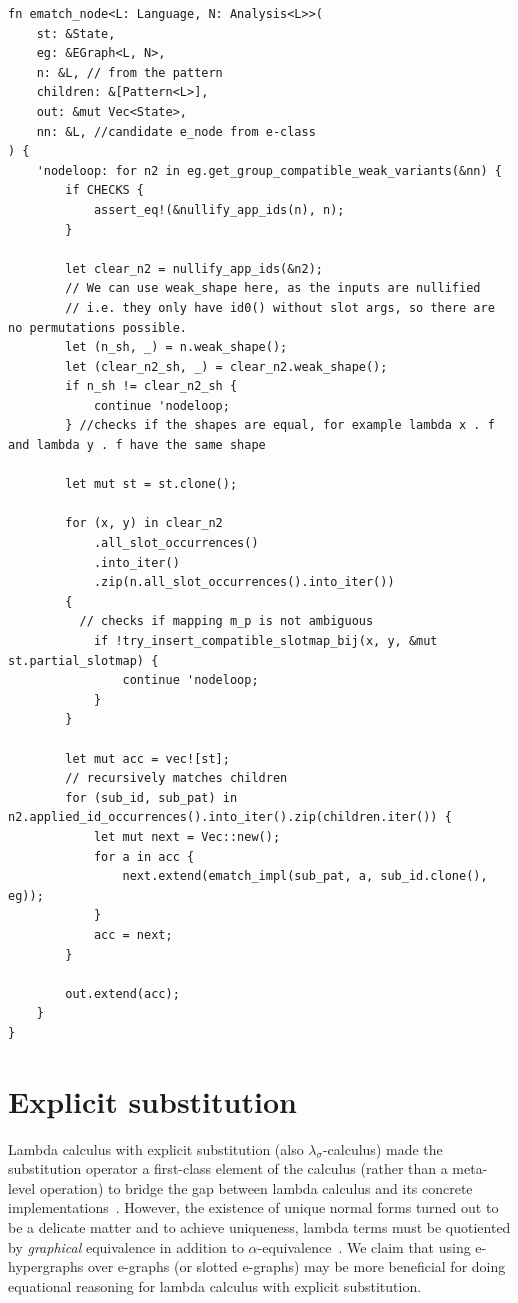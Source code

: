 \documentclass[acmsmall,screen, nonacm, anonymous]{acmart}
\begin{document}
\begin{listing}
\begin{verbatim}
fn ematch_node<L: Language, N: Analysis<L>>(
    st: &State,
    eg: &EGraph<L, N>,
    n: &L, // from the pattern
    children: &[Pattern<L>],
    out: &mut Vec<State>,
    nn: &L, //candidate e_node from e-class
) {
    'nodeloop: for n2 in eg.get_group_compatible_weak_variants(&nn) {
        if CHECKS {
            assert_eq!(&nullify_app_ids(n), n);
        }

        let clear_n2 = nullify_app_ids(&n2);
        // We can use weak_shape here, as the inputs are nullified
        // i.e. they only have id0() without slot args, so there are no permutations possible.
        let (n_sh, _) = n.weak_shape();
        let (clear_n2_sh, _) = clear_n2.weak_shape();
        if n_sh != clear_n2_sh {
            continue 'nodeloop;
        } //checks if the shapes are equal, for example lambda x . f and lambda y . f have the same shape

        let mut st = st.clone();

        for (x, y) in clear_n2
            .all_slot_occurrences()
            .into_iter()
            .zip(n.all_slot_occurrences().into_iter())
        {
          // checks if mapping m_p is not ambiguous
            if !try_insert_compatible_slotmap_bij(x, y, &mut st.partial_slotmap) {
                continue 'nodeloop;
            }
        }

        let mut acc = vec![st];
        // recursively matches children
        for (sub_id, sub_pat) in n2.applied_id_occurrences().into_iter().zip(children.iter()) {
            let mut next = Vec::new();
            for a in acc {
                next.extend(ematch_impl(sub_pat, a, sub_id.clone(), eg));
            }
            acc = next;
        }

        out.extend(acc);
    }
}

\end{verbatim}
\end{listing}

\section{Explicit substitution}

Lambda calculus with explicit substitution (also $\lambda_{\sigma}$-calculus) made the substitution operator a first-class element of the calculus (rather than a meta-level operation) to bridge the gap between lambda calculus and its concrete implementations~\cite{AbadiExplicitSubst}.
However, the existence of unique normal forms turned out to be a delicate matter and to achieve uniqueness, lambda terms must be quotiented by \textit{graphical} equivalence in addition to $\alpha$-equivalence~\cite{Standardisation}.
We claim that using e-hypergraphs over e-graphs (or slotted e-graphs) may be more beneficial for doing equational reasoning for lambda calculus with explicit substitution.
\end{document}
